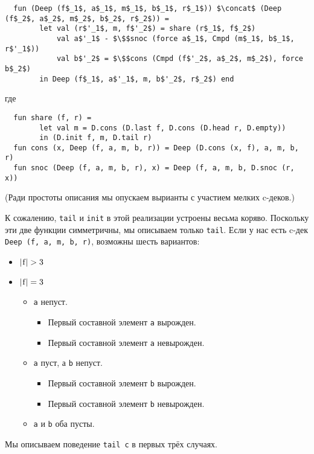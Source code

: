 \begin{lstlisting}
  fun (Deep (f$_1$, a$_1$, m$_1$, b$_1$, r$_1$)) $\concat$ (Deep (f$_2$, a$_2$, m$_2$, b$_2$, r$_2$)) =
        let val (r$'_1$, m, f$'_2$) = share (r$_1$, f$_2$)
            val a$'_1$ - $\$$snoc (force a$_1$, Cmpd (m$_1$, b$_1$, r$'_1$))
            val b$'_2$ = $\$$cons (Cmpd (f$'_2$, a$_2$, m$_2$), force b$_2$)
        in Deep (f$_1$, a$'_1$, m, b$'_2$, r$_2$) end
\end{lstlisting}
где
\begin{lstlisting}
  fun share (f, r) =
        let val m = D.cons (D.last f, D.cons (D.head r, D.empty))
        in (D.init f, m, D.tail r)
  fun cons (x, Deep (f, a, m, b, r)) = Deep (D.cons (x, f), a, m, b, r)
  fun snoc (Deep (f, a, m, b, r), x) = Deep (f, a, m, b, D.snoc (r, x))
\end{lstlisting}
(Ради простоты описания мы опускаем вырианты с участием мелких
c-деков.)

К сожалению, \lstinline!tail! и \lstinline!init! в этой реализации
устроены весьма коряво. Поскольку эти две функции симметричны, мы
описываем только \lstinline!tail!. Если у нас есть c-дек
\lstinline!Deep (f, a, m, b, r)!, возможны шесть вариантов:
\begin{itemize}
\item $|\lstinline!f!| > 3$
\item $|\lstinline!f!| = 3$
  \begin{itemize}
  \item \lstinline!a! непуст.
    \begin{itemize}
    \item Первый составной элемент \lstinline!a! вырожден.
    \item Первый составной элемент \lstinline!a! невырожден.
    \end{itemize}
  \item \lstinline!a! пуст, а \lstinline!b! непуст.
    \begin{itemize}
    \item Первый составной элемент \lstinline!b! вырожден.
    \item Первый составной элемент \lstinline!b! невырожден.
    \end{itemize}
  \item \lstinline!a! и \lstinline!b! оба пусты.
  \end{itemize}
\end{itemize}
Мы описываем поведение \lstinline!tail c! в первых трёх случаях.

